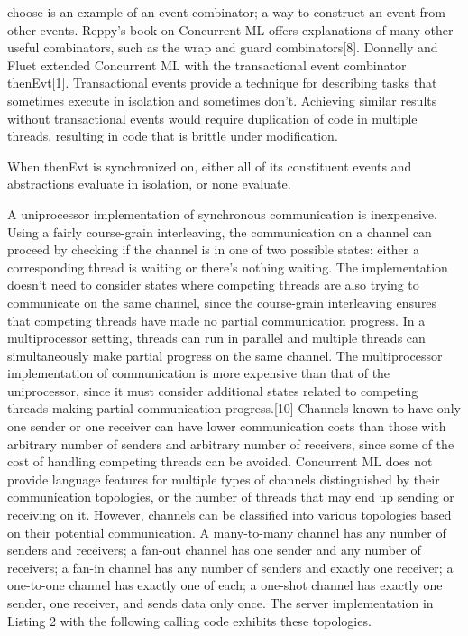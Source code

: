 \documentclass{article}
\begin{document}
choose is an example of an event combinator; a way to construct an event from other events.  Reppy's book on Concurrent ML offers explanations of many other useful combinators, such as the wrap and guard combinators[8].  Donnelly and Fluet extended Concurrent ML with the transactional event combinator thenEvt[1].  Transactional events provide a technique for describing tasks that sometimes execute in isolation and sometimes don't.  Achieving similar results without transactional events would require duplication of code in multiple threads, resulting in code that is brittle under modification.


When  thenEvt is synchronized on, either all of its constituent events and abstractions evaluate in isolation, or none evaluate.


A uniprocessor implementation of synchronous communication is inexpensive.  Using a fairly course-grain interleaving, the communication on a channel can proceed by checking if the channel is in one of two possible states: either a corresponding thread is waiting or there's nothing waiting.  The implementation doesn't need to consider states where competing threads are also trying to communicate on the same channel, since the course-grain interleaving ensures that competing threads have made no partial communication progress.  In a multiprocessor setting, threads can run in parallel and multiple threads can simultaneously make partial progress on the same channel.  The multiprocessor implementation of communication is more expensive than that of the uniprocessor, since it must consider additional states related to competing threads making partial communication progress.[10]
	Channels known to have only one sender or one receiver can have lower communication costs than those with arbitrary number of senders and arbitrary number of receivers, since some of the cost of handling competing threads can be avoided.  Concurrent ML does not provide language features for multiple types of channels distinguished by their communication topologies, or the number of threads that may end up sending or receiving on it.  However, channels can be classified into various topologies based on their potential communication.  A many-to-many channel has any number of senders and receivers; a fan-out channel has one sender and any number of receivers; a fan-in channel has any number of senders and exactly one receiver; a one-to-one channel has exactly one of each; a one-shot channel has exactly one sender, one receiver, and sends data only once.  The server implementation in Listing 2  with the following calling code exhibits these topologies.
\end{document}
